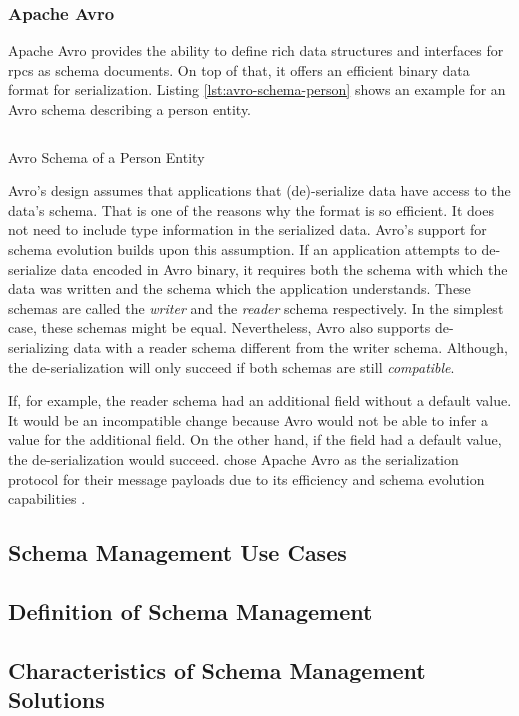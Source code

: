 \subsubsection{Apache Avro}

Apache Avro provides the ability to define rich data structures and interfaces for \glspl{rpc} as schema documents.
On top of that, it offers an efficient binary data format for serialization.
Listing \ref{lst:avro-schema-person} shows an example for an Avro schema describing a person entity.
\parencite{apache_software_foundation_apache_2021}

\begin{listing}[H]
  \inputminted{json}{assets/src/Person.avsc}
  \label{lst:avro-schema-person}
  \caption{Avro Schema of a Person Entity}
\end{listing}

Avro's design assumes that applications that (de)-serialize data have access to the data's schema.
That is one of the reasons why the format is so efficient.
It does not need to include type information in the serialized data.
Avro's support for schema evolution builds upon this assumption.
If an application attempts to de-serialize data encoded in Avro binary, it requires both the schema with which the data was written and the schema which the application understands.
These schemas are called the \emph{writer} and the \emph{reader} schema respectively.
In the simplest case, these schemas might be equal.
Nevertheless, Avro also supports de-serializing data with a reader schema different from the writer schema.
Although, the de-serialization will only succeed if both schemas are still \emph{compatible}.
\parencite{apache_software_foundation_apache_2021}

If, for example, the reader schema had an additional field without a default value.
It would be an incompatible change because Avro would not be able to infer a value for the additional field.
On the other hand, if the field had a default value, the de-serialization would succeed.
\citeauthor{kreps_kafka_2011} chose Apache Avro as the serialization protocol for their message payloads due to its efficiency and schema evolution capabilities \parencite{kreps_kafka_2011}. 

\subsection{Schema Management Use Cases}

\subsection{Definition of Schema Management}

\subsection{Characteristics of Schema Management Solutions}
